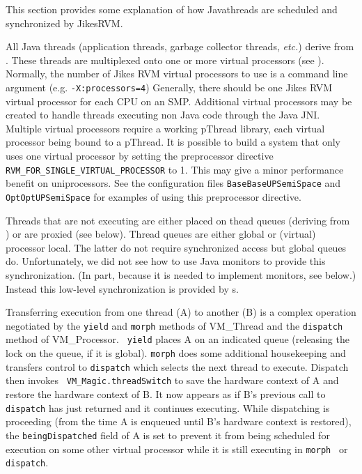 This section provides some explanation of how Java\trademark threads are
scheduled and synchronized by Jikes\trademark RVM.


All Java threads (application threads, garbage collector threads, {\em
etc.})  derive from 
.  
These threads are multiplexed onto
one or more virtual processors (see 
).  Normally, the
number of Jikes RVM virtual processors to use is a command line argument
(e.g. {\tt -X:processors=4}) Generally, there should be one Jikes RVM
virtual processor for each CPU on an SMP.  Additional virtual
processors may be created to handle threads executing non Java code
through the Java JNI.  Multiple virtual processors require a working
pThread library, each virtual processor being bound to a pThread.  It
is possible to build a system that only uses one virtual processor by
setting the preprocessor directive {\tt
RVM\_FOR\_SINGLE\_VIRTUAL\_PROCESSOR} to 1.  This may give a minor
performance benefit on uniprocessors. See the configuration files
{\tt BaseBaseUPSemiSpace} and {\tt OptOptUPSemiSpace} for examples of
using this preprocessor directive.

Threads that are not executing are either placed on thead queues
(deriving from 
) or are proxied (see below).
Thread queues are either global or (virtual) processor local.  The
latter do not require synchronized access but global queues do.
Unfortunately, we did not see how to use Java monitors to provide
this synchronization.  (In part, because it is needed to implement
monitors, see below.)  Instead this low-level synchronization is
provided by 
s.

Transferring execution from one thread (A) to another (B) is a complex
operation negotiated by the {\tt yield} and {\tt morph} methods of
VM\_Thread and the {\tt dispatch} method of VM\_Processor.  {\tt
yield} places A on an indicated queue (releasing the lock on the
queue, if it is global).  {\tt morph} does some additional
housekeeping and transfers control to {\tt dispatch} which selects the
next thread to execute. Dispatch then invokes {\tt
VM\_Magic.threadSwitch} to save the hardware context of A and restore
the hardware context of B.  It now appears as if B's previous call to
{\tt dispatch} has just returned and it continues executing. While
dispatching is proceeding (from the time A is enqueued until B's
hardware context is restored), the {\tt beingDispatched} field of A is
set to prevent it from being scheduled for execution on some other
virtual processor while it is still executing in {\tt morph } or {\tt
dispatch}. 

